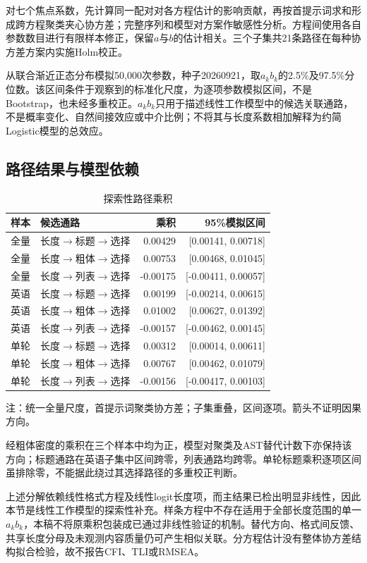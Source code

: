 \documentclass[UTF8,11pt,a4paper,fontset=windows]{ctexart}
\numberwithin{equation}{section}
\begin{document}
对七个焦点系数，先计算同一配对对各方程估计的影响贡献，再按首提示词求和形成跨方程聚类夹心协方差；完整序列和模型对方案作敏感性分析。方程间使用各自参数数目进行有限样本修正，保留$a$与$b$的估计相关。三个子集共21条路径在每种协方差方案内实施Holm校正。

从联合渐近正态分布模拟50,000次参数，种子20260921，取$a_kb_k$的2.5\%及97.5\%分位数。该区间条件于观察到的标准化尺度，为逐项参数模拟区间，不是Bootstrap，也未经多重校正。$a_kb_k$只用于描述线性工作模型中的候选关联通路，不是概率变化、自然间接效应或中介比例；不将其与长度系数相加解释为约简Logistic模型的总效应。
\subsection{路径结果与模型依赖}

\begin{table}[htbp]\centering\small\caption{探索性路径乘积}\label{tab:paths}
\begin{tabular}{llrr}\toprule
样本 & 候选通路 & 乘积 & 95\%模拟区间\\\midrule
全量 & 长度$\to$标题$\to$选择 & 0.00429 & [0.00141, 0.00718]\\
全量 & 长度$\to$粗体$\to$选择 & 0.00753 & [0.00468, 0.01045]\\
全量 & 长度$\to$列表$\to$选择 & -0.00175 & [-0.00411, 0.00057]\\
英语 & 长度$\to$标题$\to$选择 & 0.00199 & [-0.00214, 0.00615]\\
英语 & 长度$\to$粗体$\to$选择 & 0.01002 & [0.00627, 0.01392]\\
英语 & 长度$\to$列表$\to$选择 & -0.00157 & [-0.00462, 0.00145]\\
单轮 & 长度$\to$标题$\to$选择 & 0.00312 & [0.00014, 0.00611]\\
单轮 & 长度$\to$粗体$\to$选择 & 0.00767 & [0.00462, 0.01079]\\
单轮 & 长度$\to$列表$\to$选择 & -0.00156 & [-0.00417, 0.00103]\\\bottomrule\end{tabular}
\par\smallskip\footnotesize 注：统一全量尺度，首提示词聚类协方差；子集重叠，区间逐项。箭头不证明因果方向。
\end{table}

经粗体密度的乘积在三个样本中均为正，模型对聚类及AST替代计数下亦保持该方向；标题通路在英语子集中区间跨零，列表通路均跨零。单轮标题乘积逐项区间虽排除零，不能据此绕过其选择路径的多重校正判断。

上述分解依赖线性格式方程及线性logit长度项，而主结果已检出明显非线性，因此本节是线性工作模型的探索性补充。样条方程中不存在适用于全部长度范围的单一$a_kb_k$，本稿不将原乘积包装成已通过非线性验证的机制。替代方向、格式间反馈、共享长度分母及未观测内容质量仍可产生相似关联。分方程估计没有整体协方差结构拟合检验，故不报告CFI、TLI或RMSEA。
\end{document}
